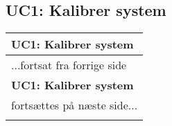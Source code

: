 \subsection{UC1: Kalibrer system}

\begin{center} \centering
	\begin{longtable}{|p{6cm}|p{8cm}|}
	\hline
		\multicolumn{2}{|l|}{\textbf{UC1: Kalibrer system}} \\\hline
		\endfirsthead
		
		\multicolumn{2}{l}{...fortsat fra forrige side} \\ \hline 
		\multicolumn{2}{|l|}{\textbf{UC1: Kalibrer system}} \\\hline
		\endhead	
		
		\multicolumn{2}{r}{fortsættes på næste side...} \\
        \endfoot
        \endlastfoot


\end{longtable}
\end{center}
